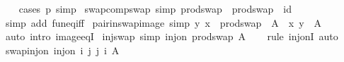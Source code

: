 \begin{isabellebody}
%
\isadelimproof
\ \ %
\endisadelimproof
%
\isatagproof
{}\isamarkupfalse%
\ {\isacharparenleft}{\kern0pt}cases\ p{\isacharparenright}{\kern0pt}\ simp%
\endisatagproof
{\isafoldproof}%
%
\isadelimproof
\isanewline
%
\endisadelimproof
\isanewline
{}\isamarkupfalse%
\ swap{\isacharunderscore}{\kern0pt}comp{\isacharunderscore}{\kern0pt}swap\ {\isacharbrackleft}{\kern0pt}simp{\isacharbrackright}{\kern0pt}{\isacharcolon}{\kern0pt}\ {\isachardoublequoteopen}prod{\isachardot}{\kern0pt}swap\ {\isasymcirc}\ prod{\isachardot}{\kern0pt}swap\ {\isacharequal}{\kern0pt}\ id{\isachardoublequoteclose}\isanewline
%
\isadelimproof
\ \ %
\endisadelimproof
%
\isatagproof
{}\isamarkupfalse%
\ {\isacharparenleft}{\kern0pt}simp\ add{\isacharcolon}{\kern0pt}\ fun{\isacharunderscore}{\kern0pt}eq{\isacharunderscore}{\kern0pt}iff{\isacharparenright}{\kern0pt}%
\endisatagproof
{\isafoldproof}%
%
\isadelimproof
\isanewline
%
\endisadelimproof
\isanewline
{}\isamarkupfalse%
\ pair{\isacharunderscore}{\kern0pt}in{\isacharunderscore}{\kern0pt}swap{\isacharunderscore}{\kern0pt}image\ {\isacharbrackleft}{\kern0pt}simp{\isacharbrackright}{\kern0pt}{\isacharcolon}{\kern0pt}\ {\isachardoublequoteopen}{\isacharparenleft}{\kern0pt}y{\isacharcomma}{\kern0pt}\ x{\isacharparenright}{\kern0pt}\ {\isasymin}\ prod{\isachardot}{\kern0pt}swap\ {\isacharbackquote}{\kern0pt}\ A\ {\isasymlongleftrightarrow}\ {\isacharparenleft}{\kern0pt}x{\isacharcomma}{\kern0pt}\ y{\isacharparenright}{\kern0pt}\ {\isasymin}\ A{\isachardoublequoteclose}\isanewline
%
\isadelimproof
\ \ %
\endisadelimproof
%
\isatagproof
{}\isamarkupfalse%
\ {\isacharparenleft}{\kern0pt}auto\ intro{\isacharbang}{\kern0pt}{\isacharcolon}{\kern0pt}\ image{\isacharunderscore}{\kern0pt}eqI{\isacharparenright}{\kern0pt}%
\endisatagproof
{\isafoldproof}%
%
\isadelimproof
\isanewline
%
\endisadelimproof
\isanewline
{}\isamarkupfalse%
\ inj{\isacharunderscore}{\kern0pt}swap\ {\isacharbrackleft}{\kern0pt}simp{\isacharbrackright}{\kern0pt}{\isacharcolon}{\kern0pt}\ {\isachardoublequoteopen}inj{\isacharunderscore}{\kern0pt}on\ prod{\isachardot}{\kern0pt}swap\ A{\isachardoublequoteclose}\isanewline
%
\isadelimproof
\ \ %
\endisadelimproof
%
\isatagproof
{}\isamarkupfalse%
\ {\isacharparenleft}{\kern0pt}rule\ inj{\isacharunderscore}{\kern0pt}onI{\isacharparenright}{\kern0pt}\ auto%
\endisatagproof
{\isafoldproof}%
%
\isadelimproof
\isanewline
%
\endisadelimproof
\isanewline
{}\isamarkupfalse%
\ swap{\isacharunderscore}{\kern0pt}inj{\isacharunderscore}{\kern0pt}on{\isacharcolon}{\kern0pt}\ {\isachardoublequoteopen}inj{\isacharunderscore}{\kern0pt}on\ {\isacharparenleft}{\kern0pt}{\isasymlambda}{\isacharparenleft}{\kern0pt}i{\isacharcomma}{\kern0pt}\ j{\isacharparenright}{\kern0pt}{\isachardot}{\kern0pt}\ {\isacharparenleft}{\kern0pt}j{\isacharcomma}{\kern0pt}\ i{\isacharparenright}{\kern0pt}{\isacharparenright}{\kern0pt}\ A{\isachardoublequoteclose}\isanewline

\end{isabellebody}
